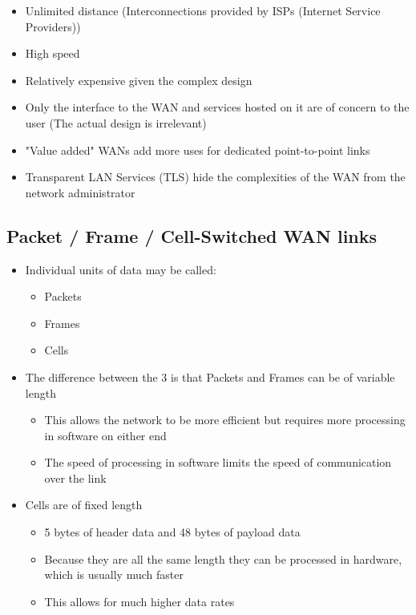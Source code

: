 
\begin{itemize}
  \item Unlimited distance (Interconnections provided by ISPs (Internet Service Providers))
  \item High speed
  \item Relatively expensive given the complex design
  \item Only the interface to the WAN and services hosted on it are of concern to the user (The actual design is irrelevant)
  \item "Value added" WANs add more uses for dedicated point-to-point links
  \item Transparent LAN Services (TLS) hide the complexities of the WAN from the network administrator
\end{itemize}

\subsection*{Packet / Frame / Cell-Switched WAN links}

\begin{itemize}
  \item Individual units of data may be called:
  \begin{itemize}
    \item Packets
    \item Frames
    \item Cells
  \end{itemize}
  \item The difference between the 3 is that Packets and Frames can be of variable length
  \begin{itemize}
    \item This allows the network to be more efficient but requires more processing in software on either end
    \item The speed of processing in software limits the speed of communication over the link
  \end{itemize}
  \item Cells are of fixed length
  \begin{itemize}
    \item 5 bytes of header data and 48 bytes of payload data
    \item Because they are all the same length they can be processed in hardware, which is usually much faster
    \item This allows for much higher data rates
  \end{itemize}
\end{itemize}

